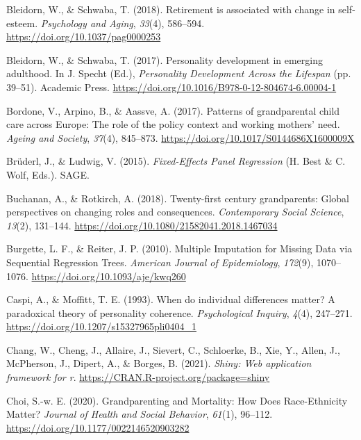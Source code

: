 \documentclass[
  english,
  man,floatsintext]{apa7}
\begin{document}
\leavevmode\hypertarget{ref-bleidornRetirementAssociatedChange2018}{}%
Bleidorn, W., \& Schwaba, T. (2018). Retirement is associated with change in self-esteem. \emph{Psychology and Aging}, \emph{33}(4), 586--594. \url{https://doi.org/10.1037/pag0000253}

\leavevmode\hypertarget{ref-bleidornPersonalityDevelopmentEmerging2017}{}%
Bleidorn, W., \& Schwaba, T. (2017). Personality development in emerging adulthood. In J. Specht (Ed.), \emph{Personality Development Across the Lifespan} (pp. 39--51). Academic Press. \url{https://doi.org/10.1016/B978-0-12-804674-6.00004-1}

\leavevmode\hypertarget{ref-bordonePatternsGrandparentalChild2017}{}%
Bordone, V., Arpino, B., \& Aassve, A. (2017). Patterns of grandparental child care across Europe: The role of the policy context and working mothers' need. \emph{Ageing and Society}, \emph{37}(4), 845--873. \url{https://doi.org/10.1017/S0144686X1600009X}

\leavevmode\hypertarget{ref-bruderlFixedEffectsPanelRegression2015}{}%
Brüderl, J., \& Ludwig, V. (2015). \emph{Fixed-Effects Panel Regression} (H. Best \& C. Wolf, Eds.). SAGE.

\leavevmode\hypertarget{ref-buchananTwentyfirstCenturyGrandparents2018}{}%
Buchanan, A., \& Rotkirch, A. (2018). Twenty-first century grandparents: Global perspectives on changing roles and consequences. \emph{Contemporary Social Science}, \emph{13}(2), 131--144. \url{https://doi.org/10.1080/21582041.2018.1467034}

\leavevmode\hypertarget{ref-burgetteMultipleImputationMissing2010}{}%
Burgette, L. F., \& Reiter, J. P. (2010). Multiple Imputation for Missing Data via Sequential Regression Trees. \emph{American Journal of Epidemiology}, \emph{172}(9), 1070--1076. \url{https://doi.org/10.1093/aje/kwq260}

\leavevmode\hypertarget{ref-caspiWhenIndividualDifferences1993}{}%
Caspi, A., \& Moffitt, T. E. (1993). When do individual differences matter? A paradoxical theory of personality coherence. \emph{Psychological Inquiry}, \emph{4}(4), 247--271. \url{https://doi.org/10.1207/s15327965pli0404_1}

\leavevmode\hypertarget{ref-R-shiny}{}%
Chang, W., Cheng, J., Allaire, J., Sievert, C., Schloerke, B., Xie, Y., Allen, J., McPherson, J., Dipert, A., \& Borges, B. (2021). \emph{Shiny: Web application framework for r}. \url{https://CRAN.R-project.org/package=shiny}

\leavevmode\hypertarget{ref-choiGrandparentingMortalityHow2020}{}%
Choi, S.-w. E. (2020). Grandparenting and Mortality: How Does Race-Ethnicity Matter? \emph{Journal of Health and Social Behavior}, \emph{61}(1), 96--112. \url{https://doi.org/10.1177/0022146520903282}
\end{document}
